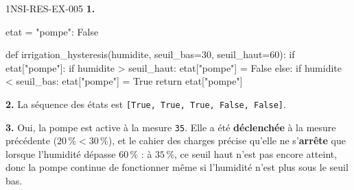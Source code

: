 \begin{corrige}{1NSI-RES-EX-005}
\textbf{1.}
\begin{python}
etat = {"pompe": False}

def irrigation_hysteresis(humidite, seuil_bas=30, seuil_haut=60):
    if etat["pompe"]:
        if humidite > seuil_haut:
            etat["pompe"] = False
    else:
        if humidite < seuil_bas:
            etat["pompe"] = True
    return etat["pompe"]
\end{python}

\textbf{2.} La séquence des états est \lstinline{[True, True, True, False, False]}.

\textbf{3.} Oui, la pompe est active à la mesure \lstinline{35}. Elle a été
\textbf{déclenchée} à la mesure précédente ($20\,\%<30\,\%$), et le cahier des charges
précise qu'elle ne s'\textbf{arrête} que lorsque l'humidité dépasse $60\,\%$ : à
$35\,\%$, ce seuil haut n'est pas encore atteint, donc la pompe continue de fonctionner
même si l'humidité n'est plus sous le seuil bas.
\end{corrige}
